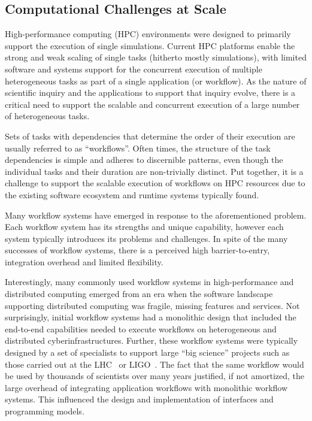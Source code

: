 \documentclass{bmcart}
\begin{document}

\subsection{Computational Challenges at Scale}\label{ssec:CC}

High-performance computing (HPC) environments were designed to primarily
support the execution of single simulations. Current HPC platforms enable the
strong and weak scaling of single tasks (hitherto mostly simulations), with
limited software and systems support for the concurrent execution of multiple
heterogeneous tasks as part of a single application (or workflow). As the
nature of scientific inquiry and the applications to support that inquiry
evolve, there is a critical need to support the scalable and concurrent
execution of a large number of heterogeneous tasks.

Sets of tasks with dependencies that determine the order of their execution
are usually referred to as ``workflows''. Often times, the structure of the
task dependencies is simple and adheres to discernible patterns, even though
the individual tasks and their duration are non-trivially distinct. Put
together, it is a challenge to support the scalable execution of workflows on
HPC resources due to the existing software ecosystem and runtime systems
typically found.

Many workflow systems have emerged in response to the aforementioned problem.
Each workflow system has its strengths and unique capability, however each
system typically introduces its problems and challenges. In spite of the many
successes of workflow systems, there is a perceived high barrier-to-entry,
integration overhead and limited flexibility.

Interestingly, many commonly used workflow systems in high-performance and
distributed computing emerged from an era when the software landscape
supporting distributed computing was fragile, missing features and services.
Not surprisingly, initial workflow systems had a monolithic design that
included the end-to-end capabilities needed to execute workflows on
heterogeneous and distributed cyberinfrastructures. Further, these workflow
systems were typically designed by a set of specialists to support large
``big science'' projects such as those carried out at the
LHC~\cite{breskin2009cern} or LIGO~\cite{althouse1992ligo}. The fact that the
same workflow would be used by thousands of scientists over many years
justified, if not amortized, the large overhead of integrating application
workflows with monolithic workflow systems. This influenced the design and
implementation of interfaces and programming models.
\end{document}
